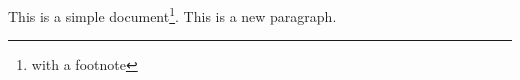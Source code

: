 \documentclass[a4paper,12pt]{article} %
\begin{document}
This is a simple
document\footnote{with a footnote}.
This is a new paragraph.
\end{document}
